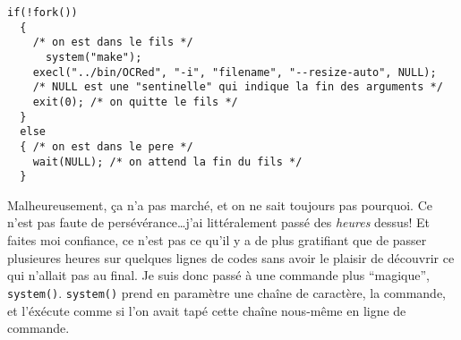 \documentclass[a4paper,10pt]{report}
\begin{document}
\begin{lstlisting}
if(!fork())   
  {
    /* on est dans le fils */
      system("make");  
    execl("../bin/OCRed", "-i", "filename", "--resize-auto", NULL);
    /* NULL est une "sentinelle" qui indique la fin des arguments */
    exit(0); /* on quitte le fils */
  }
  else
  { /* on est dans le pere */
    wait(NULL); /* on attend la fin du fils */
  }
\end{lstlisting}

Malheureusement, \c ca n'a pas march\'e, et on ne sait toujours pas pourquoi. Ce n'est pas faute de pers\'ev\'erance\ldots j'ai litt\'eralement pass\'e des \emph{heures} dessus! Et faites moi confiance, ce n'est pas ce qu'il y a de plus gratifiant que de passer plusieures heures sur quelques lignes de codes sans avoir le plaisir de d\'ecouvrir ce qui n'allait pas au final. Je suis donc pass\'e \`a une commande plus ``magique'', \verb!system()!. \verb!system()! prend en param\`etre une cha\^ine de caract\`ere, la commande, et l'\'ex\'ecute comme si l'on avait tap\'e cette cha\^ine nous-m\^eme en ligne de commande.




\end{document}
